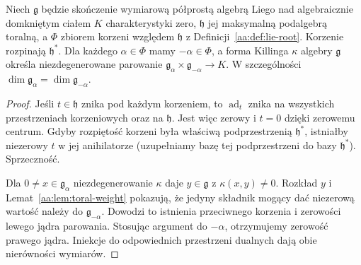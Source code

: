 \begin{twierdzenie}
\label{aa:tw:root-killing-pairing}
Niech $\mathfrak g$ będzie skończenie wymiarową półprostą algebrą Liego nad algebraicznie domkniętym ciałem $K$ charakterystyki zero, $\mathfrak h$ jej maksymalną podalgebrą toralną, a $\Phi$ zbiorem korzeni względem $\mathfrak h$ z Definicji~\ref{aa:def:lie-root}. Korzenie rozpinają $\mathfrak h^*$. Dla każdego $\alpha\in\Phi$ mamy $-\alpha\in\Phi$, a forma Killinga $\kappa$ algebry $\mathfrak g$ określa niezdegenerowane parowanie $\mathfrak g_\alpha\times\mathfrak g_{-\alpha}\to K$. W szczególności $\dim\mathfrak g_\alpha=\dim\mathfrak g_{-\alpha}$.
\end{twierdzenie}
\begin{proof}
Jeśli $t\in\mathfrak h$ znika pod każdym korzeniem, to $\operatorname{ad}_t$ znika na wszystkich przestrzeniach korzeniowych oraz na $\mathfrak h$. Jest więc zerowy i $t=0$ dzięki zerowemu centrum. Gdyby rozpiętość korzeni była właściwą podprzestrzenią $\mathfrak h^*$, istniałby niezerowy $t$ w jej anihilatorze (uzupełniamy bazę tej podprzestrzeni do bazy $\mathfrak h^*$). Sprzeczność.

Dla $0\ne x\in\mathfrak g_\alpha$ niezdegenerowanie $\kappa$ daje $y\in\mathfrak g$ z $\kappa(x,y)\ne0$. Rozkład $y$ i Lemat~\ref{aa:lem:toral-weight} pokazują, że jedyny składnik mogący dać niezerową wartość należy do $\mathfrak g_{-\alpha}$. Dowodzi to istnienia przeciwnego korzenia i zerowości lewego jądra parowania. Stosując argument do $-\alpha$, otrzymujemy zerowość prawego jądra. Iniekcje do odpowiednich przestrzeni dualnych dają obie nierówności wymiarów.
\end{proof}

